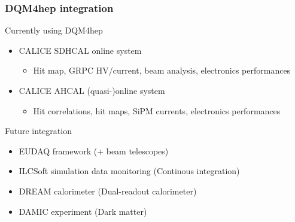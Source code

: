 \documentclass[presentation, 10pt]{beamer}
\begin{document}
\begin{frame}
  \frametitle{DQM4hep integration}
  \begin{block}{Currently using DQM4hep}
    \begin{itemize}
      \item CALICE SDHCAL online system
      \begin{itemize}
        \item Hit map, GRPC HV/current, beam analysis, electronics performances
      \end{itemize}
      \item CALICE AHCAL (quasi-)online system
      \begin{itemize}
        \item Hit correlations, hit maps, SiPM currents, electronics performances
      \end{itemize}
    \end{itemize}    
  \end{block}
  \begin{block}{Future integration}
    \begin{itemize}
      \item EUDAQ framework (+ beam telescopes)
      \item ILCSoft simulation data monitoring (Continous integration)
      \item DREAM calorimeter (Dual-readout calorimeter)
      \item DAMIC experiment (Dark matter)
    \end{itemize}
  \end{block}
\end{frame}
\end{document}
